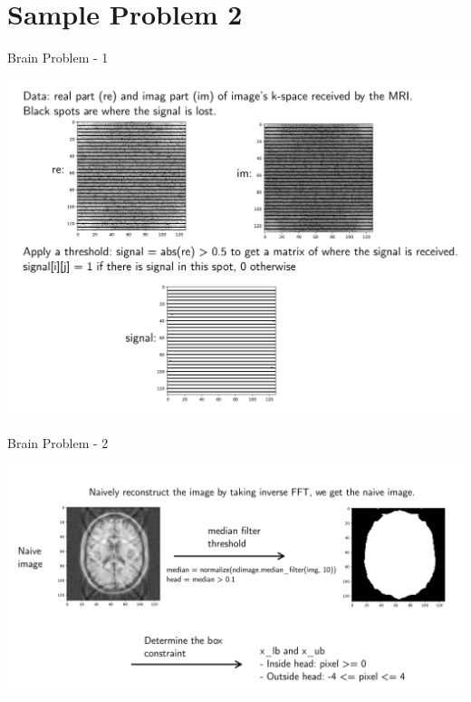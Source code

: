 \documentclass[presentation]{beamer}
\begin{document}
\section{Sample Problem 2}
\label{sec:org0fb732f}
\begin{frame}[label={sec:org0ee1152}]{Brain Problem - 1}
\begin{center}
\includegraphics[width=.9\linewidth]{figs/MRIBrain1.pdf}
\end{center}
\end{frame}

\begin{frame}[label={sec:org2a77819}]{Brain Problem - 2}
\begin{center}
\includegraphics[width=.9\linewidth]{figs/MRIBrain2.pdf}
\end{center}
\end{frame}
\end{document}
